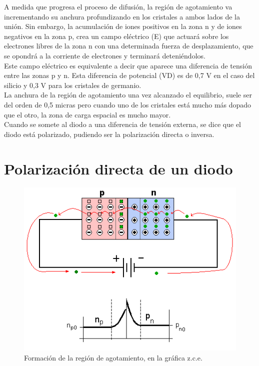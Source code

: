 A medida que progresa el proceso de difusión, la región de agotamiento va incrementando su anchura profundizando en los cristales a ambos lados de la unión. Sin embargo, la acumulación de iones positivos en la zona n y de iones negativos en la zona p, crea un campo eléctrico (E) que actuará sobre los electrones libres de la zona n con una determinada fuerza de desplazamiento, que se opondrá a la corriente de electrones y terminará deteniéndolos.\citep{diodoWiki}\\

Este campo eléctrico es equivalente a decir que aparece una diferencia de tensión entre las zonas p y n. Esta diferencia de potencial (VD) es de 0,7 V en el caso del silicio y 0,3 V para los cristales de germanio.\citep{diodoWiki}\\

La anchura de la región de agotamiento una vez alcanzado el equilibrio, suele ser del orden de 0,5 micras pero cuando uno de los cristales está mucho más dopado que el otro, la zona de carga espacial es mucho mayor.\citep{diodoWiki}\\

Cuando se somete al diodo a una diferencia de tensión externa, se dice que el diodo está polarizado, pudiendo ser la polarización directa o inversa.\citep{diodoWiki}\\

\section{Polarización directa de un diodo}

\begin{figure}[h!]
\centering
\includegraphics[scale=0.4]{PolDir.png}
\caption{Formación de la región de agotamiento, en la gráfica z.c.e.}
\label{fig:diodoDir}
\end{figure}

